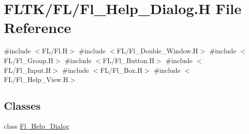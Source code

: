 \hypertarget{_fl___help___dialog_8_h}{}\section{F\+L\+T\+K/\+F\+L/\+Fl\+\_\+\+Help\+\_\+\+Dialog.H File Reference}
\label{_fl___help___dialog_8_h}
{\ttfamily \#include $<$F\+L/\+Fl.\+H$>$}\newline
{\ttfamily \#include $<$F\+L/\+Fl\+\_\+\+Double\+\_\+\+Window.\+H$>$}\newline
{\ttfamily \#include $<$F\+L/\+Fl\+\_\+\+Group.\+H$>$}\newline
{\ttfamily \#include $<$F\+L/\+Fl\+\_\+\+Button.\+H$>$}\newline
{\ttfamily \#include $<$F\+L/\+Fl\+\_\+\+Input.\+H$>$}\newline
{\ttfamily \#include $<$F\+L/\+Fl\+\_\+\+Box.\+H$>$}\newline
{\ttfamily \#include $<$F\+L/\+Fl\+\_\+\+Help\+\_\+\+View.\+H$>$}\newline
\subsection*{Classes}
\begin{DoxyCompactItemize}
\item 
class \hyperlink{class_fl___help___dialog}{Fl\+\_\+\+Help\+\_\+\+Dialog}
\end{DoxyCompactItemize}

